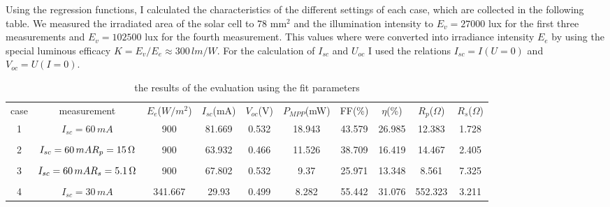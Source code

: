 \documentclass[a4paper, 12pt]{scrartcl}
\begin{document}
Using the regression functions, I calculated the characteristics of the different settings of each case, which are collected in the following table. We measured the irradiated area of the solar cell to 78 $\text{mm}^2$ and the illumination intensity to $E_v=27000$ lux for the first three measurements and $E_v=102500$ lux for the fourth measurement. \newline
This values where were converted into irradiance intensity $E_e$ by using the special luminous efficacy $K=E_v/E_e\approx300\,lm/W$. For the calculation of $I_{sc}$ and $U_{oc}$ I used the relations $I_{sc}=I(U=0)$ and $V_{oc}=U(I=0)$.

\begin{table}[H]\begin{tabular}{c || c ||c  ccccccc}\multirow[c]{2}{*}{case}&\multirow[c]{2}{2cm}{measurement}&\multirow[c]{2}{1cm}{$E_e$\newline($W/m^2$)}&\multirow[c]{2}{1cm}{$I_{sc}$\newline(mA)}&\multirow[c]{2}{1cm}{$V_{oc}$\newline(V)}&\multirow[c]{2}{1cm}{$P_{MPP}$\newline(mW)}&\multirow[c]{2}{1cm}{FF\newline(\%)}&\multirow[c]{2}{1cm}{$\eta$\newline(\%)}&\multirow[c]{2}{1cm}{$R_p$\newline($\Omega$)}&\multirow[c]{2}{1cm}{$R_s$\newline($\Omega$)}\\&&&&&&&&&\\\hline\hline
1&\multirow[c]{1}{2.5cm}{$I_{sc}=60\,mA$}&900&81.669&0.532&18.943&43.579&26.985&12.383&1.728\\&&&&&&&&&\\
2&\multirow[c]{1}{2.5cm}{$I_{sc}=60\,mA\;\newline{R}_p=15\,\Omega$}&900&63.932&0.466&11.526&38.709&16.419&14.467&2.405\\&&&&&&&&&\\
3&\multirow[c]{1}{2.5cm}{$I_{sc}=60\,mA\;\newline{R}_s=5.1\,\Omega$}&900&67.802&0.532&9.37&25.971&13.348&8.561&7.325\\&&&&&&&&&\\
4&\multirow[c]{1}{2.5cm}{$I_{sc}=30\,mA$}&341.667&29.93&0.499&8.282&55.442&31.076&552.323&3.211\end{tabular}\caption{the results of the evaluation using the fit parameters}\end{table}
\end{document}
